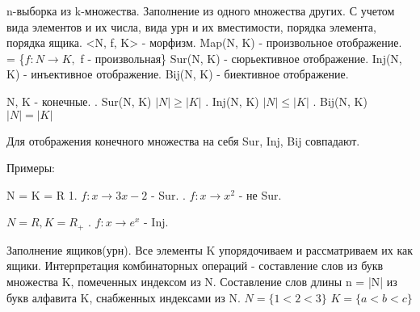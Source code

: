 \documentclass[12pt]{article}
\begin{document}
    n-выборка из k-множества. \newline
    Заполнение из одного множества других. С учетом вида элементов и их числа, вида урн и их вместимости, порядка элемента, порядка ящика. \newline
    <N, f, K> - морфизм. \newline
    Map(N, K) - произвольное отображение. = \{$f: N \rightarrow K,$ f - произвольная\} \newline
    Sur(N, K) - сюрьективное отображение. \newline
    Inj(N, K) - инъективное отображение. \newline
    Bij(N, K) - биективное отображение. \newline

    N, K - конечные. . Sur(N, K) $|N| \geq |K|$ . Inj(N, K) $|N| \leq |K|$ . Bij(N, K) $|N| = |K|$ \newline

    Для отображения конечного множества на себя Sur, Inj, Bij совпадают. \newline

    Примеры:

    N = K = R
    1. $f: x \rightarrow 3x - 2$ - Sur. . $f: x \rightarrow x^2$ - не Sur. \newline

    $N = R, K = R_+$ . $f: x \rightarrow e^x$ - Inj. \newline

    Заполнение ящиков(урн). Все элементы K упорядочиваем и рассматриваем их как ящики. \newline
    Интерпретация комбинаторных операций - составление слов из букв множества K, помеченных индексом из N. \newline
    Составление слов длины n = |N| из букв алфавита K, снабженных индексами из N. \newline
    $N = \{1 < 2 < 3\}$ \newline
    $K = \{a < b < c\}$ \newline
\end{document}
